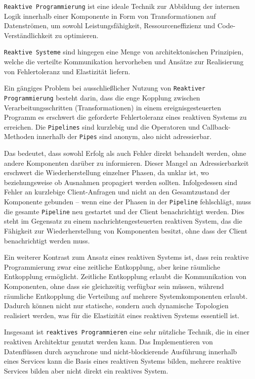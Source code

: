 \verb|Reaktive Programmierung| ist eine ideale Technik zur Abbildung der internen Logik innerhalb einer Komponente in Form von Transformationen
auf Datenströmen, um sowohl Leistungsfähigkeit, Ressourceneffizienz und Code-Verständlichkeit zu optimieren.

\verb|Reaktive Systeme| sind hingegen eine Menge von architektonischen Prinzipien, welche die verteilte Kommunikation hervorheben und
Ansätze zur Realisierung von Fehlertoleranz und Elastizität liefern.

Ein gängiges Problem bei ausschließlicher Nutzung von \verb|Reaktiver Programmierung| besteht darin, dass die enge Kopplung
zwischen Verarbeitungsschritten (Transformationen) in einem ereignisgesteuerten Programm es erschwert die geforderte Fehlertoleranz
eines reaktiven Systems zu erreichen.
Die \verb|Pipelines| sind kurzlebig und die Operatoren und Callback-Methoden innerhalb der \verb|Pipes|
sind anonym, also nicht adressierbar.

Das bedeutet, dass sowohl Erfolg als auch Fehler direkt behandelt werden, ohne andere Komponenten darüber zu informieren.
Dieser Mangel an Adressierbarkeit erschwert die Wiederherstellung einzelner Phasen, da unklar ist, wo beziehungsweise ob Ausnahmen
propagiert werden sollten. Infolgedessen sind Fehler an kurzlebige Client-Anfragen und nicht an den
Gesamtzustand der Komponente gebunden – wenn eine der Phasen in der \verb|Pipeline| fehlschlägt, muss die gesamte \verb|Pipeline| neu
gestartet und der Client benachrichtigt werden. Dies steht im Gegensatz zu einem nachrichtengesteuerten reaktiven System, das
die Fähigkeit zur Wiederherstellung von Komponenten besitzt, ohne dass der Client benachrichtigt werden muss.

Ein weiterer Kontrast zum Ansatz eines reaktiven Systems ist, dass rein reaktive Programmierung zwar eine zeitliche Entkopplung,
aber keine räumliche Entkopplung ermöglicht. Zeitliche Entkopplung erlaubt die Kommunikation von Komponenten, ohne dass sie gleichzeitig
verfügbar sein müssen, während räumliche Entkopplung
die Verteilung auf mehrere Systemkomponenten erlaubt. Dadurch können nicht nur statische, sondern auch dynamische Topologien
realisiert werden, was für die Elastizität eines reaktiven Systems essentiell ist.

Insgesamt ist \verb|reaktives Programmieren| eine sehr nützliche Technik, die in einer reaktiven Architektur genutzt werden kann.
Das Implementieren von Datenflüssen durch asynchrone und nicht-blockierende Ausführung innerhalb eines Services kann die
Basis eines reaktiven Systems bilden, mehrere reaktive Services bilden aber nicht direkt ein reaktives System.\parencite{Lightbend}


